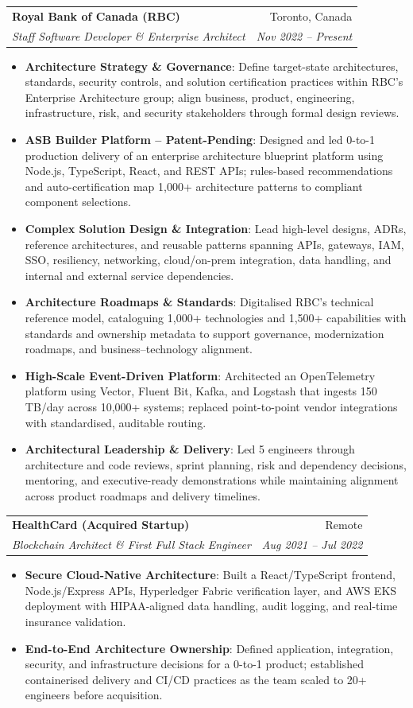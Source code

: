 \documentclass[letterpaper,9.5pt]{article}
\makeatletter
\newcommand{\resumeItem}[2]{\item\small{\textbf{#1}{: #2 \vspace{-2pt}}}}
\newcommand{\resumeSubheading}[4]{\vspace{-2pt}\item\begin{tabular*}{0.97\textwidth}{l@{\extracolsep{\fill}}r}\textbf{#1} & #2 \\\textit{\small#3} & \textit{\small #4} \\\end{tabular*}\vspace{-6pt}}
\newcommand{\resumeItemListStart}{\begin{itemize}}
\newcommand{\resumeItemListEnd}{\end{itemize}\vspace{-6pt}}
\makeatother
\begin{document}
  \resumeSubheading
    {Royal Bank of Canada (RBC)}{Toronto, Canada}
    {Staff Software Developer \& Enterprise Architect}{Nov 2022 -- Present}
  \resumeItemListStart
    \resumeItem{Architecture Strategy \& Governance}
      {Define target-state architectures, standards, security controls, and solution certification practices within RBC's Enterprise Architecture group; align business, product, engineering, infrastructure, risk, and security stakeholders through formal design reviews.}
    \resumeItem{ASB Builder Platform -- Patent-Pending}
      {Designed and led 0-to-1 production delivery of an enterprise architecture blueprint platform using Node.js, TypeScript, React, and REST APIs; rules-based recommendations and auto-certification map 1,000+ architecture patterns to compliant component selections.}
    \resumeItem{Complex Solution Design \& Integration}
      {Lead high-level designs, ADRs, reference architectures, and reusable patterns spanning APIs, gateways, IAM, SSO, resiliency, networking, cloud/on-prem integration, data handling, and internal and external service dependencies.}
    \resumeItem{Architecture Roadmaps \& Standards}
      {Digitalised RBC's technical reference model, cataloguing 1,000+ technologies and 1,500+ capabilities with standards and ownership metadata to support governance, modernization roadmaps, and business--technology alignment.}
    \resumeItem{High-Scale Event-Driven Platform}
      {Architected an OpenTelemetry platform using Vector, Fluent Bit, Kafka, and Logstash that ingests 150\,TB/day across 10,000+ systems; replaced point-to-point vendor integrations with standardised, auditable routing.}
    \resumeItem{Architectural Leadership \& Delivery}
      {Led 5 engineers through architecture and code reviews, sprint planning, risk and dependency decisions, mentoring, and executive-ready demonstrations while maintaining alignment across product roadmaps and delivery timelines.}
  \resumeItemListEnd

  \resumeSubheading
    {HealthCard (Acquired Startup)}{Remote}
    {Blockchain Architect \& First Full Stack Engineer}{Aug 2021 -- Jul 2022}
  \resumeItemListStart
    \resumeItem{Secure Cloud-Native Architecture}
      {Built a React/TypeScript frontend, Node.js/Express APIs, Hyperledger Fabric verification layer, and AWS EKS deployment with HIPAA-aligned data handling, audit logging, and real-time insurance validation.}
    \resumeItem{End-to-End Architecture Ownership}
      {Defined application, integration, security, and infrastructure decisions for a 0-to-1 product; established containerised delivery and CI/CD practices as the team scaled to 20+ engineers before acquisition.}
  \resumeItemListEnd
\end{document}
